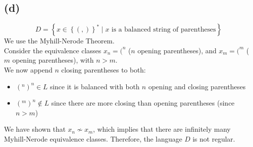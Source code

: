 \subsection{(d)}
$$D = \left\{ x \in \left\{(,)\right\}^{\ast} \mid x \text{ is a balanced string of parentheses} \right\}$$
We use the Myhill-Nerode Theorem.\\
Consider the equivalence classes $x_{n} = (^{n}$ ($n$ opening parentheses), and $x_{m} = (^{m}$ ($m$ opening parentheses), with $n>m$.\\
We now append $n$ closing parentheses to both:\\
\begin{itemize}
    \item $(^{n})^{n} \in L$ since it is balanced with both $n$ opening and closing parentheses
    \item $(^{m})^{n} \notin L$ since there are more closing than opening parentheses (since $n>m$)
\end{itemize}
We have shown that $x_{n} \nsim x_{m}$, which implies that there are infinitely many Myhill-Nerode equivalence classes. Therefore, the language $D$ is not regular.


